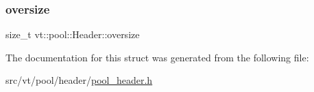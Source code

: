 \mbox{\label{structvt_1_1pool_1_1_header_ac3271e96a2c67c907795aa172b3f70cb}} 
\subsubsection{\texorpdfstring{oversize}{oversize}}
{\footnotesize\ttfamily size\+\_\+t vt\+::pool\+::\+Header\+::oversize}



The documentation for this struct was generated from the following file\+:\begin{DoxyCompactItemize}
\item 
src/vt/pool/header/\hyperlink{pool__header_8h}{pool\+\_\+header.\+h}\end{DoxyCompactItemize}
